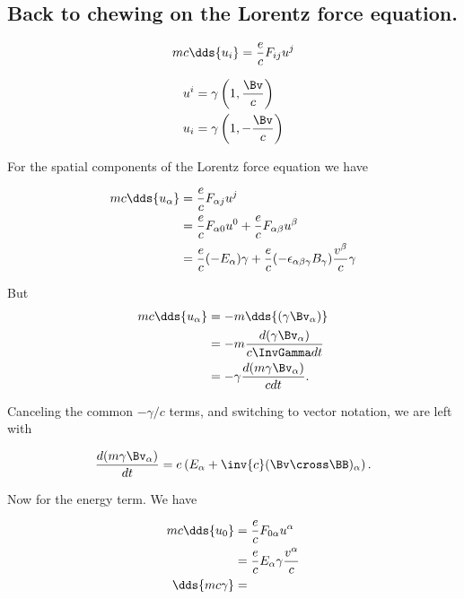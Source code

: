 \subsection{Back to chewing on the Lorentz force equation.}

\begin{equation}\label{eqn:relativisticElectrodynamicsL11:270}
m c \dds{ u_i } = \frac{e}{c} F_{i j} u^j
\end{equation}

\begin{align}\label{eqn:relativisticElectrodynamicsL11:290}
u^i &= \gamma \left( 1, \frac{\Bv}{c} \right) \\
u_i &= \gamma \left( 1, -\frac{\Bv}{c} \right)
\end{align}

For the spatial components of the Lorentz force equation we have

\begin{align*}
m c \dds{ u_\alpha } 
&= \frac{e}{c} F_{\alpha j} u^j \\
&= \frac{e}{c} F_{\alpha 0} u^0
+ \frac{e}{c} F_{\alpha \beta} u^\beta \\
&= \frac{e}{c} (-E_{\alpha}) \gamma
+ \frac{e}{c} (- \epsilon_{\alpha\beta\gamma} B_\gamma ) \frac{v^\beta}{c} \gamma 
\end{align*}

But
\begin{align*}
m c \dds{ u_\alpha } 
&= -m \dds{(\gamma \Bv_\alpha)} \\
&= -m \frac{d(\gamma \Bv_\alpha)}{c \InvGamma dt} \\
&= -\gamma \frac{d(m \gamma \Bv_\alpha)}{c dt}.
\end{align*}

Canceling the common $-\gamma/c$ terms, and switching to vector notation, we are left with

\begin{equation}\label{eqn:relativisticElectrodynamicsL11:310}
\frac{d( m \gamma \Bv_\alpha)}{dt} = e \left( E_\alpha + \inv{c} (\Bv \cross \BB)_\alpha \right).
\end{equation}

Now for the energy term.  We have 

\begin{align*}
m c \dds{u_0} 
&= \frac{e}{c} F_{0\alpha} u^\alpha \\
&= \frac{e}{c} E_{\alpha} \gamma \frac{v^\alpha}{c} \\
\dds{ m c \gamma } &=
\end{align*}

